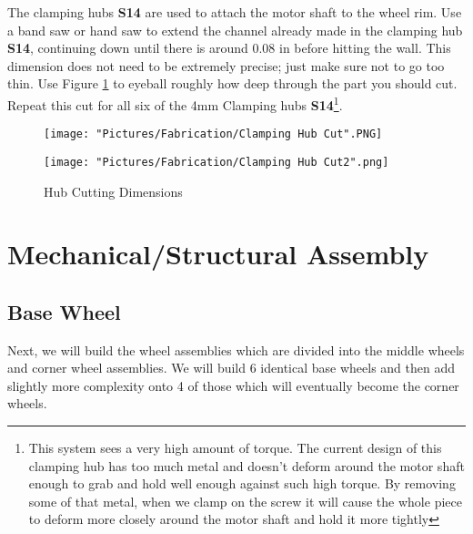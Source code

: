 \documentclass[12pt]{article}
\begin{document}
The clamping hubs \textbf{S14} are used to attach the motor shaft to the wheel rim. Use a band saw or hand saw to extend the channel already made in the clamping hub \textbf{S14}, continuing down until there is around 0.08 in before hitting the wall. This dimension does not need to be extremely precise; just make sure not to go too thin. Use Figure \ref{Clamping hub cut} to eyeball roughly how deep through the part you should cut. Repeat this cut for all six of the 4mm Clamping hubs \textbf{S14}\footnote{This system sees a very high amount of torque. The current design of this clamping hub has too much metal and doesn't deform around the motor shaft enough to grab and hold well enough against such high torque. By removing some of that metal, when we clamp on the screw it will cause the whole piece to deform more closely around the motor shaft and hold it more tightly}.


\begin{figure}[H]
  \centering
  \begin{minipage}[b]{0.45\textwidth}
    \texttt{[image: "Pictures/Fabrication/Clamping Hub Cut".PNG]}
  \end{minipage}
  \hfill
  \begin{minipage}[b]{0.45\textwidth}
    \texttt{[image: "Pictures/Fabrication/Clamping Hub Cut2".png]}
  \end{minipage}
  \caption{Hub Cutting Dimensions}
  \label{Clamping hub cut}
\end{figure}

\section{Mechanical/Structural Assembly}

\subsection{Base Wheel}
Next, we will build the wheel assemblies which are divided into the middle wheels and corner wheel assemblies. We will build 6 identical base wheels and then add slightly more complexity onto 4 of those which will eventually become the corner wheels.
\end{document}
